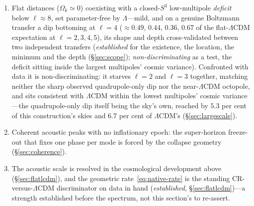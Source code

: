 \documentclass[11pt,a4paper]{article}
\theoremstyle{plain}
\theoremstyle{definition}
\theoremstyle{remark}
\begin{document}
\begin{enumerate}
Writing the law as $r=Au^{2/3}g(u)$ with $g=[\sinh u/u]^{2/3}$ places every branched factor in $u^{2/3}$ and leaves $g$ even, analytic and non-vanishing at the origin---exactly, since $\log(\sinh u/u)$ is analytic in $u^{2}$ there and the exponential of a series in $u^{2}$ is one. The three sheets differ by a constant cube root of unity, and a constant multiplier cannot change a parity; the conjugate branch is even as well, and carries no branch point at all. \emph{So the evenness is unavoidable, and what it says is not a technical fact but a symmetry}: $r(-\tau)=r(\tau)$, the cosmogenesis is time-symmetric about the branch point, and a time-symmetric background cannot mix a growing mode with a decaying one, since mixing would distinguish a direction of time the background does not. \emph{The same invariance appears one observable over}: the driven acoustic amplitude of \S\ref{sec:coherence} is a resonant Fourier magnitude exactly invariant under time reversal, a theorem about the driving, though what it carries about the peak heights is what that section's instrument does not return. \emph{One symmetry, read at two places.} \emph{And it locates rather than forecloses what would be needed}: this leg is exactly even because it is the marginally-bound geodesic of an exactly vacuum exterior, so a progenitor carrying real matter content---pressure, dissipation, anything with an arrow---would not be, which returns the question to what the progenitor was.
\item Flat distances ($\Omega_k\simeq0$) coexisting with a closed-$S^3$ low-multipole \emph{deficit} below $\ell\approx8$, set parameter-free by $\Lambda$---mild, and on a genuine Boltzmann transfer a dip bottoming at $\ell=4$ ($\approx0.49$, $0.44$, $0.36$, $0.67$ of the flat-$\Lambda$CDM expectation at $\ell=2,3,4,5$), its shape and depth cross-validated between two independent transfers (\emph{established} for the existence, the location, the minimum and the depth (\S\ref{sec:scope}); \emph{non-discriminating} as a test, the deficit sitting inside the largest multipoles' cosmic variance). Confronted with data it is non-discriminating: it starves $\ell=2$ and $\ell=3$ together, matching neither the sharp observed quadrupole-only dip nor the near-$\Lambda$CDM octopole, and sits consistent with $\Lambda$CDM within the lowest multipoles' cosmic variance---the quadrupole-only dip itself being the sky's own, reached by $5.3$ per cent of this construction's skies and $6.7$ per cent of $\Lambda$CDM's (\S\ref{sec:largescale}).
\item Coherent acoustic peaks with no inflationary epoch: the super-horizon freeze-out that fixes one phase per mode is forced by the collapse geometry (\S\ref{sec:coherence}).
\item The acoustic scale is resolved in the cosmological development above (\S\ref{sec:flatlcdm}), and the geometric rate~\eqref{eq:native-rate} is the standing CR-versus-$\Lambda$CDM discriminator on data in hand (\emph{established}, \S\ref{sec:flatlcdm})---a strength established before the spectrum, not this section's to re-assert.
\end{enumerate}
\end{document}
